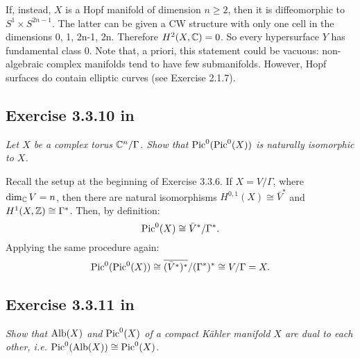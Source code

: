\documentclass{article}
\begin{document}
If, instead, $X$ is a Hopf manifold of dimension $n\geq 2$, then it is diffeomorphic to $S^1 \times S^{2n-1}$.
The latter can be given a CW structure with only one cell in the dimensions 0, 1, 2n-1, 2n. Therefore
$H^2(X,\mathbb{C}) = 0$. So every hypersurface $Y$ has fundamental class 0. Note that, a priori, this statement could
be vacuous: non-algebraic complex manifolds tend to have few submanifolds. However, Hopf surfaces do contain elliptic
curves (see Exercise 2.1.7).


\subsection*{Exercise 3.3.10 in \cite{Huy}}
\emph{Let $X$ be a complex torus $\mathbb{C}^n/\Gamma$. Show that $\operatorname{Pic}^0(\operatorname{Pic}^0(X))$ is naturally isomorphic to $X$.}
\vspace{3mm}

Recall the setup at the beginning of Exercise 3.3.6. If $X = V/\Gamma$, where $\dim_{\mathbb{C}} V = n$, then there are natural
isomorphisms $H^{0,1}(X) \cong \bar V^*$ and $H^1(X,\mathbb{Z}) \cong \Gamma^*$. Then, by definition:
\[	\operatorname{Pic}^0(X) \cong \bar V^* / \Gamma^* .	\]
Applying the same procedure again:
\[	\operatorname{Pic}^0(\operatorname{Pic}^0(X)) \cong \overline{(\bar V^*)^*} / (\Gamma^*)^* \cong V/\Gamma = X.	\]


\subsection*{Exercise 3.3.11 in \cite{Huy}}
\emph{Show that $\operatorname{Alb}(X)$ and $\operatorname{Pic}^0(X)$ of a compact K\"{a}hler manifold $X$ are dual
to each other, i.e. $\operatorname{Pic}^0(\operatorname{Alb}(X)) \cong \operatorname{Pic}^0(X)$.}
\vspace{3mm}
\end{document}
